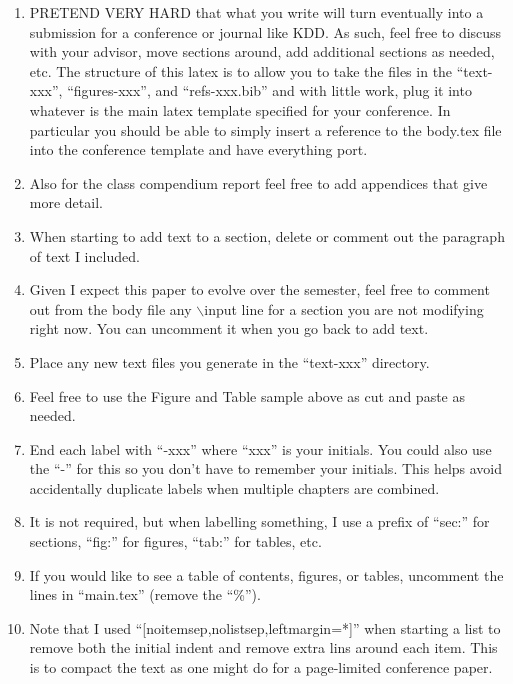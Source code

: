 \begin{enumerate}[noitemsep,nolistsep,leftmargin=*]
    \item PRETEND VERY HARD that what you write will turn eventually into a submission for a conference or journal like KDD. As such, feel free to discuss with your advisor, move sections around, add additional sections as needed, etc. The structure of this latex is to allow you to take the files in the ``text-xxx'', ``figures-xxx'', and ``refs-xxx.bib'' and with little work, plug it into whatever is the main latex template specified for your conference. In particular you should be able to simply insert a reference to the body.tex file into the conference template and have everything port.
    
    \item Also for the class compendium report feel free to add appendices that give more detail.
    
    \item When starting to add text to a section, delete or comment out the paragraph of text I included.
    
    \item Given I expect this paper to evolve over the semester, feel free to comment out from the body file any $\backslash$input line for a section you are not modifying right now. You can uncomment it when you go back to add text.
    
    \item Place any new text files you generate in the ``text-xxx'' directory.
    
    \item Feel free to use the Figure and Table sample above as cut and paste as needed.
    
    \item End each label with ``-xxx'' where ``xxx'' is your initials. You could also use the ``-\myInitials'' for this so you don't have to remember your initials. This helps avoid accidentally duplicate labels when multiple chapters are combined.
    
    \item It is not required, but when labelling something, I use a prefix of ``sec:'' for sections, ``fig:'' for figures, ``tab:'' for tables, etc.
    
    \item If you would like to see a table of contents, figures, or tables, uncomment the lines in ``main.tex'' (remove the ``\%'').
    
    \item Note that I used ``[noitemsep,nolistsep,leftmargin=*]'' when starting a list to remove both the initial indent and remove extra lins around each item. This is to compact the text as one might do for a page-limited conference paper.
    

\end{enumerate}
